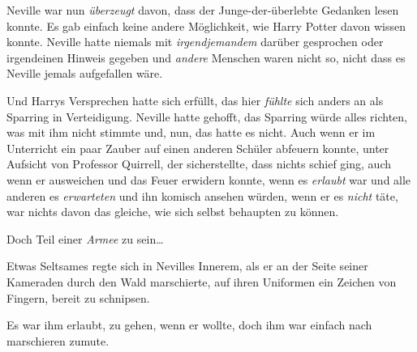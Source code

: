 Neville war nun \emph{überzeugt} davon, dass der Junge-der-überlebte Gedanken lesen konnte. Es gab einfach keine andere Möglichkeit, wie Harry Potter davon wissen konnte. Neville hatte niemals mit \emph{irgendjemandem} darüber gesprochen oder irgendeinen Hinweis gegeben und \emph{andere} Menschen waren nicht so, nicht dass es Neville jemals aufgefallen wäre.

Und Harrys Versprechen hatte sich erfüllt, das hier \emph{fühlte} sich anders an als Sparring in Verteidigung. Neville hatte gehofft, das Sparring würde alles richten, was mit ihm nicht stimmte und, nun, das hatte es nicht. Auch wenn er im Unterricht ein paar Zauber auf einen anderen Schüler abfeuern konnte, unter Aufsicht von Professor Quirrell, der sicherstellte, dass nichts schief ging, auch wenn er ausweichen und das Feuer erwidern konnte, wenn es \emph{erlaubt} war und alle anderen es \emph{erwarteten} und ihn komisch ansehen würden, wenn er es \emph{nicht} täte, war nichts davon das gleiche, wie sich selbst behaupten zu können.

Doch Teil einer \emph{Armee} zu sein…

Etwas Seltsames regte sich in Nevilles Innerem, als er an der Seite seiner Kameraden durch den Wald marschierte, auf ihren Uniformen ein Zeichen von Fingern, bereit zu schnipsen.

Es war ihm erlaubt, zu gehen, wenn er wollte, doch ihm war einfach nach marschieren zumute.

